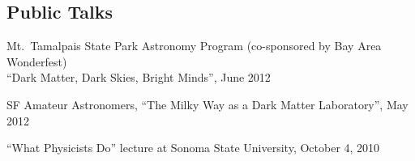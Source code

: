 \begin{resume}
\section{\sc Public Talks}
\begin{list1}
\item Mt.~Tamalpais State Park Astronomy Program (co-sponsored by Bay Area Wonderfest) \\ ``Dark Matter, Dark Skies, Bright Minds'', June 2012

\item SF Amateur Astronomers, ``The Milky Way as a Dark Matter Laboratory'', May 2012

\item ``What Physicists Do'' lecture at Sonoma State University, October 4, 2010
\end{list1}

\end{resume}


